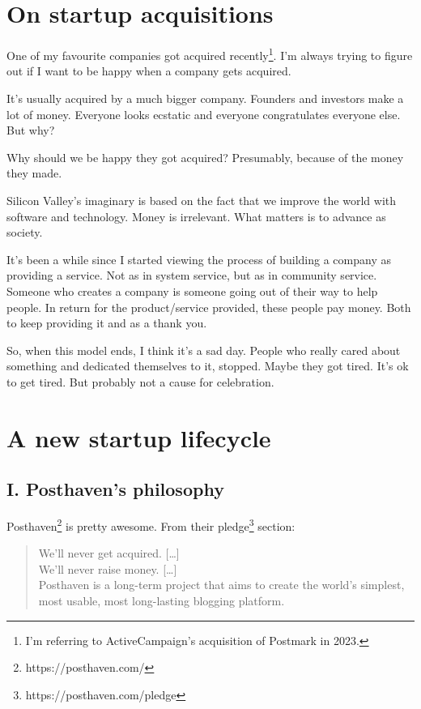 \section{On startup acquisitions}

One of my favourite companies got acquired recently\footnote{I'm referring to ActiveCampaign’s acquisition of Postmark in 2023.}. I’m always trying to figure out if I want to be happy when a company gets acquired.

It’s usually acquired by a much bigger company. Founders and investors make a lot of money. Everyone looks ecstatic and everyone congratulates everyone else. But why?

Why should we be happy they got acquired? Presumably, because of the money they made.

Silicon Valley’s imaginary is based on the fact that we improve the world with software and technology. Money is irrelevant. What matters is to advance as society.

It’s been a while since I started viewing the process of building a company as providing a service. Not as in system service, but as in community service. Someone who creates a company is someone going out of their way to help people. In return for the product/service provided, these people pay money. Both to keep providing it and as a thank you.

So, when this model ends, I think it’s a sad day. People who really cared about something and dedicated themselves to it, stopped. Maybe they got tired. It’s ok to get tired. But probably not a cause for celebration.

\section{A new startup lifecycle}

\subsection{I. Posthaven’s philosophy}

Posthaven\footnote{https://posthaven.com/} is pretty awesome. From their pledge\footnote{https://posthaven.com/pledge} section:

\begin{quote}
    We’ll never get acquired. [\dots]\\
    We’ll never raise money. [\dots]\\
    Posthaven is a long-term project that aims to create the world’s simplest, most usable, most long-lasting blogging platform.
\end{quote}

